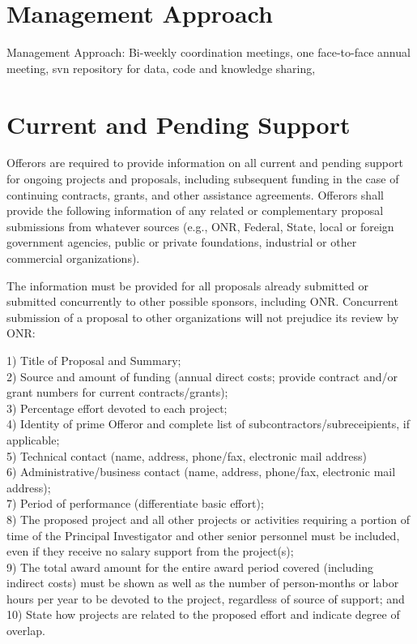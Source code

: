 \section{Management Approach}

Management Approach: Bi-weekly coordination meetings, one face-to-face annual meeting, svn  repository for data, code and knowledge sharing, 


\section{Current and Pending Support}

Offerors are required to provide
information on all current and pending support for ongoing projects and proposals, including
subsequent funding in the case of continuing contracts, grants, and other assistance agreements.
Offerors shall provide the following information of any related or complementary proposal
submissions from whatever sources (e.g., ONR, Federal, State, local or foreign government
agencies, public or private foundations, industrial or other commercial organizations).

The information must be provided for all proposals already submitted or submitted concurrently
to other possible sponsors, including ONR. Concurrent submission of a proposal to other
organizations will not prejudice its review by ONR: 

1) Title of Proposal and Summary;\\
2) Source and amount of funding (annual direct costs; provide contract and/or
grant numbers for current contracts/grants);\\
3) Percentage effort devoted to each project;\\
4) Identity of prime Offeror and complete list of subcontractors/subreceipients, if
applicable;\\
5) Technical contact (name, address, phone/fax, electronic mail address)\\
6) Administrative/business contact (name, address, phone/fax, electronic mail
address);\\
7) Period of performance (differentiate basic effort);\\
8) The proposed project and all other projects or activities requiring a portion of
time of the Principal Investigator and other senior personnel must be included,
even if they receive no salary support from the project(s);\\


9) The total award amount for the entire award period covered (including indirect
costs) must be shown as well as the number of person-months or labor hours per
year to be devoted to the project, regardless of source of support; and\\

10) State how projects are related to the proposed effort and indicate degree of
overlap. 

